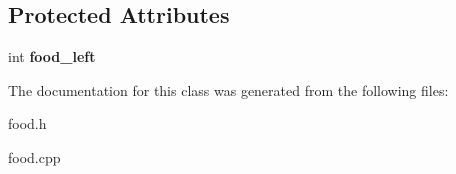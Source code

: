 \subsection*{Protected Attributes}
\begin{DoxyCompactItemize}
\item 
\hypertarget{classda__game_1_1Food_ae76b10729eed85aff9a77e6193df89cd}{
int {\bfseries food\_\-left}}
\label{classda__game_1_1Food_ae76b10729eed85aff9a77e6193df89cd}

\end{DoxyCompactItemize}


The documentation for this class was generated from the following files:\begin{DoxyCompactItemize}
\item 
food.h\item 
food.cpp\end{DoxyCompactItemize}
